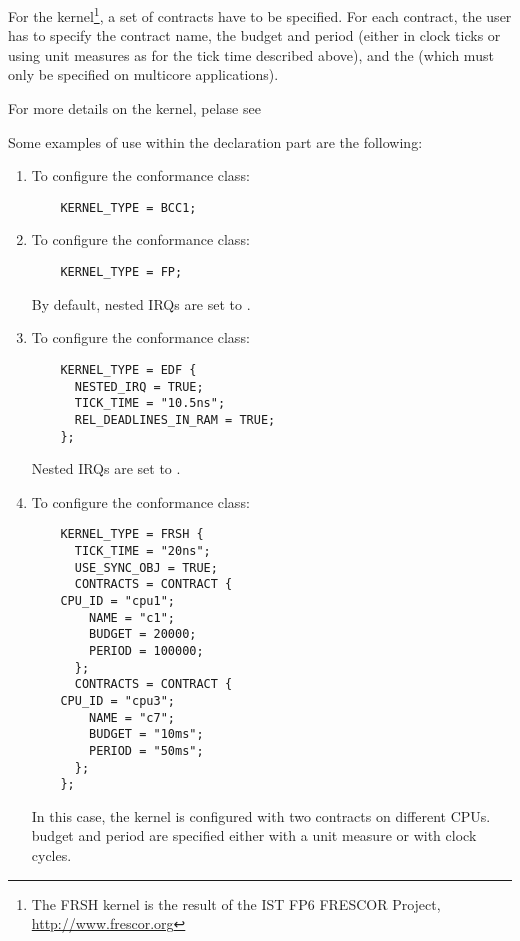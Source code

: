 For the  kernel\footnote{The FRSH kernel is the result of
the IST FP6 FRESCOR Project, \url{http://www.frescor.org}}, a set of
contracts have to be specified. For each contract, the user has to
specify the contract name, the budget and period (either in clock
ticks or using unit measures as for the tick time described above),
and the  (which must only be specified on multicore
applications).

For more details on the  kernel, pelase see

Some examples of use within the declaration part are the following:

\begin{enumerate}

\item
  To configure the  conformance class:
  \begin{lstlisting}
    KERNEL_TYPE = BCC1;
  \end{lstlisting}
  
\item
  To configure the  conformance class: 
  
  \begin{lstlisting}
    KERNEL_TYPE = FP;
  \end{lstlisting}
  
  By default, nested IRQs are set to .
  
\item
  To configure the  conformance class:
  
  \begin{lstlisting}
    KERNEL_TYPE = EDF { 
      NESTED_IRQ = TRUE; 
      TICK_TIME = "10.5ns"; 
      REL_DEADLINES_IN_RAM = TRUE;
    };
  \end{lstlisting}
  
  Nested IRQs are set to .

\item
  To configure the  conformance class:
  
  \begin{lstlisting}
    KERNEL_TYPE = FRSH {
      TICK_TIME = "20ns";
      USE_SYNC_OBJ = TRUE;
      CONTRACTS = CONTRACT {
	CPU_ID = "cpu1";
        NAME = "c1";
        BUDGET = 20000;
        PERIOD = 100000;
      };
      CONTRACTS = CONTRACT {
	CPU_ID = "cpu3";
        NAME = "c7";
        BUDGET = "10ms";
        PERIOD = "50ms";
      };
    };
  \end{lstlisting}

  In this case, the  kernel is configured with two
  contracts on different CPUs. budget and period are specified either
  with a unit measure or with clock cycles.
  
\end{enumerate}



